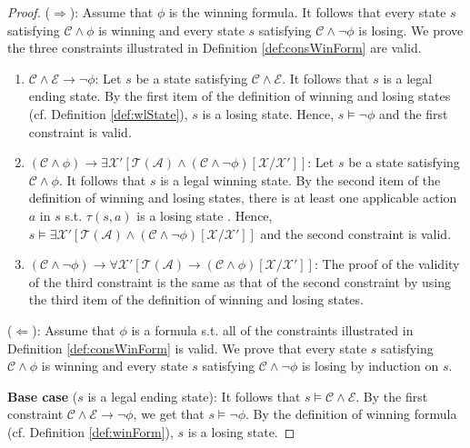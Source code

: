 \documentclass[review]{elsarticle}
\newcommand{\statevar}{\mathcal{X}}
\newcommand{\act}{\mathcal{A}}
\newcommand{\trans}{\mathcal{T}}
\newcommand{\constraint}{\mathcal{C}}
\newcommand{\estate}{\mathcal{E}}
\begin{document}
	\begin{proof}
		($\Rightarrow$): Assume that $\phi$ is the winning formula.
		It follows that every state $s$ satisfying $\constraint \land \phi$ is winning and every state $s$ satisfying $\constraint \land \neg \phi$ is losing.	
		We prove the three constraints illustrated in Definition \ref{def:consWinForm} are valid.
		\begin{enumerate}
			\item $\constraint \land \estate \rightarrow \neg \phi$: 
			Let $s$ be a state satisfying $\constraint \land \estate$.
			It follows that $s$ is a legal ending state.
			By the first item of the definition of winning and losing states (cf. Definition \ref{def:wlState}), $s$ is a losing state.
			Hence, $s \models \neg \phi$ and the first constraint is valid.
				
			\item $(\constraint \land \phi) \rightarrow \exists \statevar' [\trans(\act) \land (\constraint \land \neg \phi)[\statevar/\statevar']]$: 
			Let $s$ be a state satisfying $\constraint \land \phi$.
			It follows that $s$ is a legal winning state.
			By the second item of the definition of winning and losing states, there is at least one applicable action $a$ in $s$ s.t. $\tau(s, a)$ is a losing state .
			Hence, $s \models \exists \statevar' [\trans(\act) \land (\constraint \land \neg \phi)[\statevar/\statevar']]$ and the second constraint is valid.
			
			\item $(\constraint \land \neg \phi) \rightarrow \forall \statevar' [\trans(\act) \rightarrow (\constraint \land \phi)[\statevar/\statevar']]$:
			The proof of the validity of the third constraint is the same as that of the second constraint by using the third item of the definition of winning and losing states.
		\end{enumerate}
				
		($\Leftarrow$): Assume that $\phi$ is a formula s.t. all of the constraints illustrated in Definition \ref{def:consWinForm} is valid.
		We prove that every state $s$ satisfying $\constraint \land \phi$ is winning and every state $s$ satisfying $\constraint \land \neg \phi$ is losing by induction on $s$.
		
		\textbf{Base case} ($s$ is a legal ending state): 
		It follows that $s \models \constraint \land \estate$.	
		By the first constraint $\constraint \land \estate \rightarrow \neg \phi$, we get that $s \models \neg \phi$.
		By the definition of winning formula (cf. Definition \ref{def:winForm}), $s$ is a losing state.
		

\end{proof}
\end{document}

